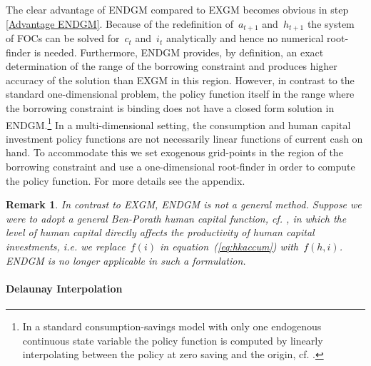\documentclass[a4paper,12pt]{article}%
\newtheorem{remark}[theorem]{Remark}
\begin{document}
The clear advantage of ENDGM compared to EXGM becomes obvious in step \ref{Advantage ENDGM}. Because of the redefinition of~$a_{t+1}$ and~$h_{t+1}$ the system of FOCs can be solved for~$c_{t}$ and~$i_{t}$ analytically and hence no numerical root-finder is needed. Furthermore, ENDGM provides, by definition, an exact determination of the range of the borrowing constraint and produces higher accuracy of the solution than EXGM in this region. However, in contrast to the standard one-dimensional problem, the policy function itself in the range where the borrowing constraint is binding does not have a closed form solution in ENDGM.\footnote{In a standard consumption-savings model with only one endogenous continuous state variable the policy function is computed by linearly interpolating between the policy at zero saving and the origin, cf. .}
In a multi-dimensional setting, the consumption and human capital investment policy functions are not necessarily linear functions of current cash on hand. To accommodate this we set exogenous grid-points in the region of the borrowing constraint and use a one-dimensional root-finder in order to compute the policy function. For more details see the appendix.

\begin{remark}
\label{rem:failureendgm} In contrast to EXGM, ENDGM is not a general method. Suppose we were to adopt a general Ben-Porath human capital function, cf. , in which the level of human capital directly affects the productivity of human capital investments, i.e. we replace~$f(i)$ in equation~(\ref{eq:hkaccum}) with~$f(h,i)$. ENDGM is no longer applicable in such a formulation.
\end{remark}

\paragraph{Delaunay Interpolation}
\end{document}
